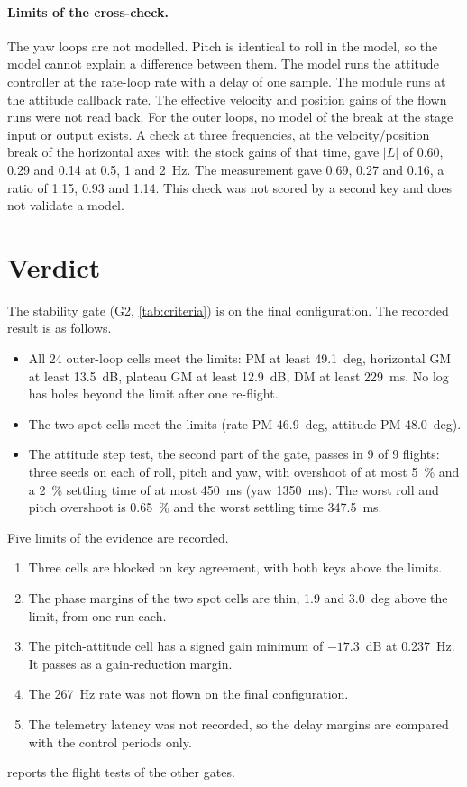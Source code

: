 \paragraph{Limits of the cross-check.}
The yaw loops are not modelled.
Pitch is identical to roll in the model, so the model cannot explain a difference between them.
The model runs the attitude controller at the rate-loop rate with a delay of one sample.
The module runs at the attitude callback rate.
The effective velocity and position gains of the flown runs were not read back.
For the outer loops, no model of the break at the stage input or output exists.
A check at three frequencies, at the velocity/position break of the horizontal axes with the stock gains of that time, gave $|L|$ of 0.60, 0.29 and 0.14 at 0.5, 1 and 2~Hz.
The measurement gave 0.69, 0.27 and 0.16, a ratio of 1.15, 0.93 and 1.14.
This check was not scored by a second key and does not validate a model.

\section{Verdict}\label{sec:an_verdict}

The stability gate (G2, \cref{tab:criteria}) is \passed{} on the final configuration.
The recorded result is as follows.
\begin{itemize}
  \item All 24 outer-loop cells meet the limits: PM at least 49.1~deg, horizontal GM at least 13.5~dB, plateau GM at least 12.9~dB, DM at least 229~ms. No log has holes beyond the limit after one re-flight.
  \item The two spot cells meet the limits (rate PM 46.9~deg, attitude PM 48.0~deg).
  \item The attitude step test, the second part of the gate, passes in 9 of 9 flights: three seeds on each of roll, pitch and yaw, with overshoot of at most 5~\% and a 2~\% settling time of at most 450~ms (yaw 1350~ms). The worst roll and pitch overshoot is 0.65~\% and the worst settling time 347.5~ms.
\end{itemize}
Five limits of the evidence are recorded.
\begin{enumerate}
  \item Three cells are blocked on key agreement, with both keys above the limits.
  \item The phase margins of the two spot cells are thin, 1.9 and 3.0~deg above the limit, from one run each.
  \item The pitch-attitude cell has a signed gain minimum of $-17.3$~dB at 0.237~Hz. It passes as a gain-reduction margin.
  \item The 267~Hz rate was not flown on the final configuration.
  \item The telemetry latency was not recorded, so the delay margins are compared with the control periods only.
\end{enumerate}
 reports the flight tests of the other gates.
